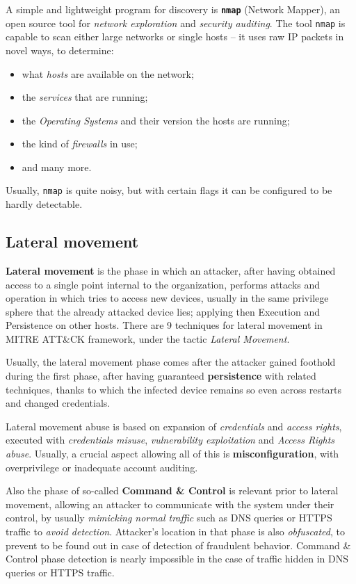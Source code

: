 \documentclass[10pt]{extbook}
\begin{document}
A simple and lightweight program for discovery is \textbf{\texttt{nmap}}
(Network Mapper), an open source tool for \emph{network exploration} and
\emph{security auditing}. The tool \texttt{nmap} is capable to scan either
large networks or single hosts -- it uses raw IP packets in novel ways, to
determine:
\begin{itemize}
    \item what \emph{hosts} are available on the network;
    \item the \emph{services} that are running;
    \item the \emph{Operating Systems} and their version the hosts are running;
    \item the kind of \emph{firewalls} in use;
    \item and many more.
\end{itemize}

Usually, \texttt{nmap} is quite noisy, but with certain flags it can be
configured to be hardly detectable.


\subsection{Lateral movement}

\textbf{Lateral movement} is the phase in which an attacker, after having
obtained access to a single point internal to the organization, performs
attacks and operation in which tries to access new devices, usually in the same
privilege sphere that the already attacked device lies; applying then Execution
and Persistence on other hosts. There are 9 techniques for lateral movement in
MITRE ATT\&CK framework, under the tactic \emph{Lateral Movement}.

Usually, the lateral
movement phase comes after the attacker gained foothold during the first phase,
after having guaranteed \textbf{persistence} with related techniques, thanks to
which the infected device remains so even across restarts and changed
credentials. 

Lateral movement abuse is based on expansion of \emph{credentials} and
\emph{access rights}, executed with \emph{credentials misuse},
\emph{vulnerability exploitation} and \emph{Access Rights abuse}. Usually, a
crucial aspect allowing all of this is \textbf{misconfiguration}, with
overprivilege or inadequate account auditing.

Also the phase of so\--called \textbf{Command \& Control} is
relevant prior to lateral movement, allowing an attacker to communicate with
the system under their control, by usually \emph{mimicking normal traffic} such
as DNS queries or HTTPS traffic to \emph{avoid detection}. Attacker's location
in that phase is also \emph{obfuscated}, to prevent to be found out in case of
detection of fraudulent behavior. Command \& Control phase detection is nearly
impossible in the case of traffic hidden in DNS queries or HTTPS traffic. 
\end{document}
